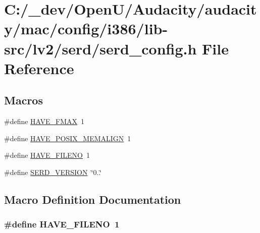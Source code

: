 \hypertarget{mac_2config_2i386_2lib-src_2lv2_2serd_2serd__config_8h}{}\section{C\+:/\+\_\+dev/\+Open\+U/\+Audacity/audacity/mac/config/i386/lib-\/src/lv2/serd/serd\+\_\+config.h File Reference}
\label{mac_2config_2i386_2lib-src_2lv2_2serd_2serd__config_8h}
\subsection*{Macros}
\begin{DoxyCompactItemize}
\item 
\#define \hyperlink{mac_2config_2i386_2lib-src_2lv2_2serd_2serd__config_8h_a542866fcebc2e1cc2b710fb6c2ec54f3}{H\+A\+V\+E\+\_\+\+F\+M\+AX}~1
\item 
\#define \hyperlink{mac_2config_2i386_2lib-src_2lv2_2serd_2serd__config_8h_af67975c34ba72163273efe7cfb3afa0c}{H\+A\+V\+E\+\_\+\+P\+O\+S\+I\+X\+\_\+\+M\+E\+M\+A\+L\+I\+GN}~1
\item 
\#define \hyperlink{mac_2config_2i386_2lib-src_2lv2_2serd_2serd__config_8h_acbc37357ec546ab973057c6a8fa96a67}{H\+A\+V\+E\+\_\+\+F\+I\+L\+E\+NO}~1
\item 
\#define \hyperlink{mac_2config_2i386_2lib-src_2lv2_2serd_2serd__config_8h_a18233bcddb49feb0aec12cb37de361dc}{S\+E\+R\+D\+\_\+\+V\+E\+R\+S\+I\+ON}~\char`\"{}0..\char`\"{}
\end{DoxyCompactItemize}


\subsection{Macro Definition Documentation}
\subsubsection[{\texorpdfstring{H\+A\+V\+E\+\_\+\+F\+I\+L\+E\+NO}{HAVE_FILENO}}]{\setlength{\rightskip}{0pt plus 5cm}\#define H\+A\+V\+E\+\_\+\+F\+I\+L\+E\+NO~1}\hypertarget{mac_2config_2i386_2lib-src_2lv2_2serd_2serd__config_8h_acbc37357ec546ab973057c6a8fa96a67}{}\label{mac_2config_2i386_2lib-src_2lv2_2serd_2serd__config_8h_acbc37357ec546ab973057c6a8fa96a67}


